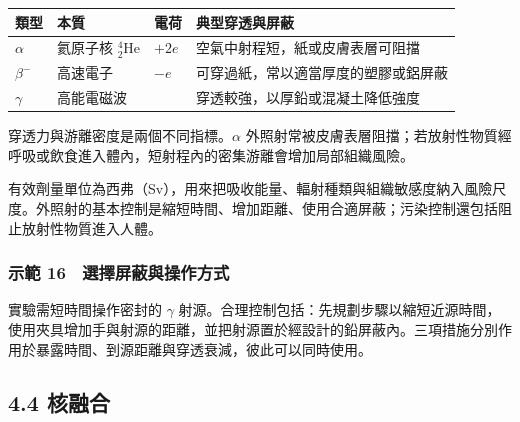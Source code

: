 \documentclass[11pt,a4paper]{article}
\newcounter{none}
\begin{document}
{\def\LTcaptype{none} %
\begin{longtable}[]{@{}
  >{\raggedright\arraybackslash}p{}
  >{\raggedright\arraybackslash}p{}
  >{\raggedleft\arraybackslash}p{}
  >{\raggedright\arraybackslash}p{}@{}}
\toprule\noalign{}
\begin{minipage}[b]{\linewidth}\raggedright
類型
\end{minipage} & \begin{minipage}[b]{\linewidth}\raggedright
本質
\end{minipage} & \begin{minipage}[b]{\linewidth}\raggedleft
電荷
\end{minipage} & \begin{minipage}[b]{\linewidth}\raggedright
典型穿透與屏蔽
\end{minipage} \\
\midrule\noalign{}
\endhead
\bottomrule\noalign{}
\endlastfoot
\(\alpha\) & 氦原子核 \({}^4_2\mathrm{He}\) & \(+2e\) & 空氣中射程短，紙或皮膚表層可阻擋 \\
\(\beta^-\) & 高速電子 & \(-e\) & 可穿過紙，常以適當厚度的塑膠或鋁屏蔽 \\
\(\gamma\) & 高能電磁波 & 0 & 穿透較強，以厚鉛或混凝土降低強度 \\
\end{longtable}
}

穿透力與游離密度是兩個不同指標。\(\alpha\) 外照射常被皮膚表層阻擋；若放射性物質經呼吸或飲食進入體內，短射程內的密集游離會增加局部組織風險。

有效劑量單位為西弗（Sv），用來把吸收能量、輻射種類與組織敏感度納入風險尺度。外照射的基本控制是縮短時間、增加距離、使用合適屏蔽；污染控制還包括阻止放射性物質進入人體。

\subsubsection{示範 16　選擇屏蔽與操作方式}\label{ux793aux7bc4-16-ux9078ux64c7ux5c4fux853dux8207ux64cdux4f5cux65b9ux5f0f}

實驗需短時間操作密封的 \(\gamma\) 射源。合理控制包括：先規劃步驟以縮短近源時間，使用夾具增加手與射源的距離，並把射源置於經設計的鉛屏蔽內。三項措施分別作用於暴露時間、到源距離與穿透衰減，彼此可以同時使用。

\subsection{4.4 核融合}\label{ux6838ux878dux5408}
\end{document}
